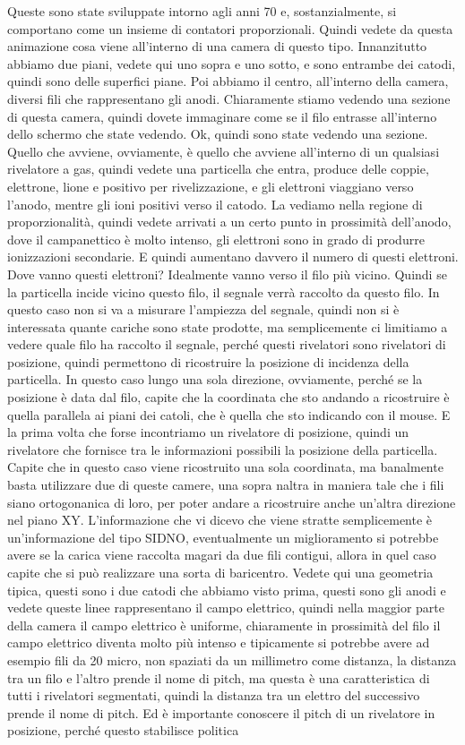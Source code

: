 Queste sono state sviluppate intorno agli anni 70 e, sostanzialmente, si comportano come un insieme di contatori proporzionali. Quindi vedete da questa animazione cosa viene all'interno di una camera di questo tipo. Innanzitutto abbiamo due piani, vedete qui uno sopra e uno sotto, e sono entrambe dei catodi, quindi sono delle superfici piane. Poi abbiamo il centro, all'interno della camera, diversi fili che rappresentano gli anodi. Chiaramente stiamo vedendo una sezione di questa camera, quindi dovete immaginare come se il filo entrasse all'interno dello schermo che state vedendo. Ok, quindi sono state vedendo una sezione. Quello che avviene, ovviamente, è quello che avviene all'interno di un qualsiasi rivelatore a gas, quindi vedete una particella che entra, produce delle coppie, elettrone, lione e positivo per rivelizzazione, e gli elettroni viaggiano verso l'anodo, mentre gli ioni positivi verso il catodo. La vediamo nella regione di proporzionalità, quindi vedete arrivati a un certo punto in prossimità dell'anodo, dove il campanettico è molto intenso, gli elettroni sono in grado di produrre ionizzazioni secondarie. E quindi aumentano davvero il numero di questi elettroni. Dove vanno questi elettroni? Idealmente vanno verso il filo più vicino. Quindi se la particella incide vicino questo filo, il segnale verrà raccolto da questo filo. In questo caso non si va a misurare l'ampiezza del segnale, quindi non si è interessata quante cariche sono state prodotte, ma semplicemente ci limitiamo a vedere quale filo ha raccolto il segnale, perché questi rivelatori sono rivelatori di posizione, quindi permettono di ricostruire la posizione di incidenza della particella. In questo caso lungo una sola direzione, ovviamente, perché se la posizione è data dal filo, capite che la coordinata che sto andando a ricostruire è quella parallela ai piani dei catoli, che è quella che sto indicando con il mouse. E la prima volta che forse incontriamo un rivelatore di posizione, quindi un rivelatore che fornisce tra le informazioni possibili la posizione della particella. Capite che in questo caso viene ricostruito una sola coordinata, ma banalmente basta utilizzare due di queste camere, una sopra naltra in maniera tale che i fili siano ortogonanica di loro, per poter andare a ricostruire anche un'altra direzione nel piano XY. L'informazione che vi dicevo che viene stratte semplicemente è un'informazione del tipo SIDNO, eventualmente un miglioramento si potrebbe avere se la carica viene raccolta magari da due fili contigui, allora in quel caso capite che si può realizzare una sorta di baricentro. Vedete qui una geometria tipica, questi sono i due catodi che abbiamo visto prima, questi sono gli anodi e vedete queste linee rappresentano il campo elettrico, quindi nella maggior parte della camera il campo elettrico è uniforme, chiaramente in prossimità del filo il campo elettrico diventa molto più intenso e tipicamente si potrebbe avere ad esempio fili da 20 micro, non spaziati da un millimetro come distanza, la distanza tra un filo e l'altro prende il nome di pitch, ma questa è una caratteristica di tutti i rivelatori segmentati, quindi la distanza tra un elettro del successivo prende il nome di pitch. Ed è importante conoscere il pitch di un rivelatore in posizione, perché questo stabilisce politica 